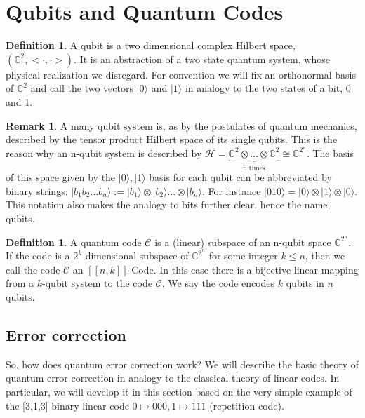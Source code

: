 \documentclass{article}
\def\C{\mathbb{C}}
\theoremstyle{definition}
\newtheorem{rem}[Satz]{Remark}
\newtheorem{defn}[Satz]{Definition}
\begin{document}
\clearpage \newpage
\section{Qubits and Quantum Codes}

\begin{defn}
A qubit is a two dimensional complex Hilbert space, $(\C^2, < \cdot , \cdot >)$. It is an abstraction of a two state quantum system, whose physical realization we disregard. For convention we will fix an orthonormal basis of $\C^2$ and call the two vectors $|0\rangle$ and $|1\rangle$ in analogy to the two states of a bit, 0 and 1. 
\end{defn}

\begin{rem}
A many qubit system is, as by the postulates of quantum mechanics, described by the tensor product Hilbert space of its single qubits. This is the reason why an n-qubit system is described by $\mathcal{H} = \underbrace{\C^2 \otimes \ldots \otimes \C^2}_\text{n times} \cong \C^{2^n}$. The basis of this space given by the $|0\rangle , |1\rangle$ basis for each qubit can be abbreviated by binary strings: $ | b_1 b_2 \ldots b_n \rangle := |b_1 \rangle \otimes | b_2 \rangle \ldots \otimes |b_n \rangle$. For instance $ |010\rangle = | 0 \rangle \otimes |1 \rangle \otimes |0 \rangle$. This notation also makes the analogy to bits further clear, hence the name, qubits. 
\end{rem}

\begin{defn}
A quantum code $\mathcal{C}$ is a (linear) subspace of an n-qubit space $\C^{2^n}$. If the code is a $2^k$ dimensional subspace of $\C^{2^n}$ for some integer $k \leq n$, then we call the code $\mathcal{C}$ an $[[n,k]]$-Code. In this case there is a bijective linear mapping from a $k$-qubit system to the code $\mathcal{C}$. We say the code encodes $k$ qubits in $n$ qubits.
\end{defn}


\subsection{Error correction}


So, how does quantum error correction work? We will describe the basic theory of quantum error correction in analogy to the classical theory of linear codes. In particular, we will develop it in this section based on the very simple example of the [3,1,3] binary linear code $ 0 \mapsto 000, 1 \mapsto 111$ (repetition code).
\end{document}
